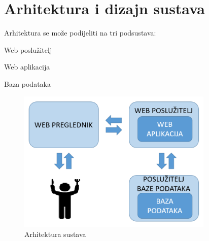\chapter{Arhitektura i dizajn sustava}

Arhitektura se može podijeliti na tri podsustava:

\begin{packed_item}
	\item Web poslužitelj
	\item Web aplikacija
	\item Baza podataka
\end{packed_item}

\begin{figure}[H]
	\includegraphics[scale=0.8]{slike/Slika11.png} %
	\centering
	\caption{Arhitektura sustava}
	\label{fig:promjene}
\end{figure}

